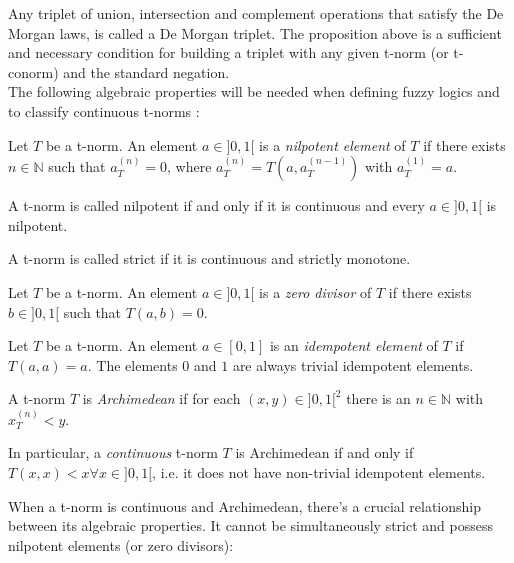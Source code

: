 Any triplet of union, intersection and complement operations that satisfy the De Morgan laws, is called a De Morgan triplet\cite[p.~52]{HistoryFL2017}. The proposition above is a sufficient and necessary condition for building a triplet with any given t-norm (or t-conorm) and the standard negation.\\

The following algebraic properties will be needed when defining fuzzy logics and to classify continuous t-norms \cite[Def.~2.1 \& 2.13]{Klement2000}:

\begin{definition}
Let $T$ be a t-norm. An element $a \in ]0,1[$ is a \emph{nilpotent element} of $T$ if there exists $n \in \mathbb{N}$ such that $a_T^{(n)} = 0$, where $a_T^{(n)} = T(a, a_T^{(n-1)})$ with $a_T^{(1)}=a$.

A t-norm is called nilpotent if and only if it is continuous and every $a\in ]0,1[$ is nilpotent.
\end{definition}

\begin{definition}
  A t-norm is called strict if it is continuous and strictly monotone.
\end{definition}


\begin{definition}
Let $T$ be a t-norm. An element $a \in ]0,1[$ is a \emph{zero divisor} of $T$ if there exists $b \in ]0,1[$ such that $T(a,b)=0$.
\end{definition}

\begin{definition}
  Let $T$ be a t-norm. An element $a \in [0,1]$ is an \emph{idempotent element} of $T$ if $T(a,a)=a$. The elements $0$ and $1$ are always trivial idempotent elements.
  \end{definition}
  

\begin{definition}
A t-norm $T$ is \emph{Archimedean} if for each $(x,y) \in ]0,1[^2$ there is an $n \in \mathbb{N}$ with $x_T^{(n)} < y$. \cite[Def.~2.9]{Klement2000}  

In particular, a \textit{continuous} t-norm $T$ is Archimedean if and only if $T(x,x) < x \forall x \in ]0,1[$, i.e. it does not have non-trivial idempotent elements. \cite[Thm.~2.12]{Klement2000}
\end{definition}


When a t-norm is continuous and Archimedean, there's a crucial relationship between its algebraic properties. It cannot be simultaneously strict and possess nilpotent elements (or zero divisors):

